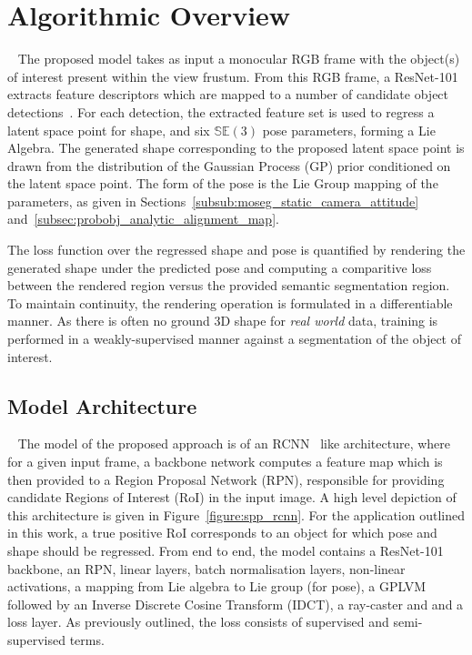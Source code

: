 \section{Algorithmic Overview}
~\label{sec:spp_algorithm}
The proposed model takes as input a monocular RGB frame with the object(s) of interest present within the 
view frustum. From this RGB frame, a ResNet-101~\cite{He2015} extracts feature descriptors which are mapped 
to a number of candidate object detections~\cite{Girshick2014,Girshick2015_2}. For each detection, the extracted 
feature set is used to regress a latent space point for shape, and six \( \mathbb{SE}(3) \) pose parameters, forming 
a Lie Algebra. The generated shape corresponding to the proposed latent space point is drawn from the distribution 
of the Gaussian Process (GP) prior conditioned on the latent space point. The form of the pose is the Lie 
Group mapping of the parameters, as given in Sections~\ref{subsub:moseg_static_camera_attitude} 
and~\ref{subsec:probobj_analytic_alignment_map}. 

The loss function over the regressed shape and pose is quantified by rendering the generated shape 
under the predicted pose and computing a comparitive loss between the rendered region versus the provided semantic 
segmentation region. To maintain continuity, the rendering operation is formulated in a differentiable manner. As there 
is often no ground 3D shape for \textit{real world} data, training is performed in a weakly-supervised manner against a 
segmentation of the object of interest.

\subsection{Model Architecture}
~\label{subsec:spp_network_architecture}
The model of the proposed approach is of an RCNN~\cite{Girshick2014} like architecture, where for a 
given input frame, a backbone network computes a feature map which is then provided to a Region 
Proposal Network (RPN), responsible for providing candidate Regions of Interest (RoI) in the input image. 
A high level depiction of this architecture is given in Figure~\ref{figure:spp_rcnn}.
For the application outlined in this work, a true positive RoI corresponds to an object for which pose and 
shape should be regressed. From end to end, the model contains a ResNet-101~\cite{He2015} backbone, an RPN,
linear layers, batch normalisation layers, non-linear activations, a mapping from Lie algebra to 
Lie group (for pose), a GPLVM followed by an Inverse Discrete Cosine Transform (IDCT), a ray-caster and 
and a loss layer. As previously outlined, the loss consists of supervised and semi-supervised terms.

